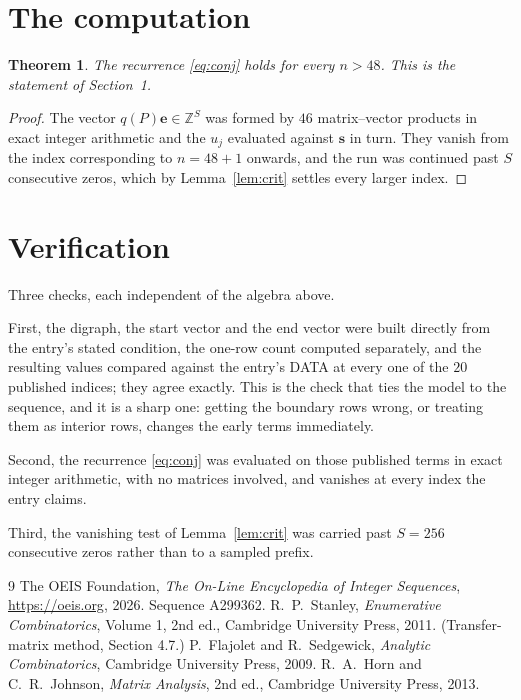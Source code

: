 \documentclass[11pt,a4paper]{article}
\theoremstyle{plain}
\newtheorem{theorem}{Theorem}
\theoremstyle{definition}
\begin{document}
\section{The computation}

\begin{theorem}
The recurrence \eqref{eq:conj} holds for every $n>48$. This is the statement of
Section~1.
\end{theorem}

\begin{proof}
The vector $q(P)\mathbf{e}\in\mathbb{Z}^{S}$ was formed by $46$ matrix--vector
products in exact integer arithmetic and the $u_j$ evaluated against $\mathbf{s}$ in turn.
They vanish from the index corresponding to $n=48+1$ onwards, and the run was continued
past $S$ consecutive zeros, which by Lemma~\ref{lem:crit} settles every larger index.
\end{proof}

\section{Verification}

Three checks, each independent of the algebra above.

First, the digraph, the start vector and the end vector were built directly from the
entry's stated condition, the one-row count computed separately, and the resulting values
compared against the entry's DATA at every one of the $20$ published indices; they
agree exactly. This is the check that ties the model to the sequence, and it is a sharp one:
getting the boundary rows wrong, or treating them as interior rows, changes the early terms
immediately.

Second, the recurrence \eqref{eq:conj} was evaluated on those published terms in exact
integer arithmetic, with no matrices involved, and vanishes at every index the entry claims.

Third, the vanishing test of Lemma~\ref{lem:crit} was carried past $S=256$ consecutive
zeros rather than to a sampled prefix.

\begin{thebibliography}{9}
 The OEIS Foundation, \emph{The On-Line Encyclopedia of Integer
Sequences}, \url{https://oeis.org}, 2026. Sequence A299362.
 R.~P.~Stanley, \emph{Enumerative Combinatorics}, Volume 1, 2nd ed.,
Cambridge University Press, 2011. (Transfer-matrix method, Section 4.7.)
 P.~Flajolet and R.~Sedgewick, \emph{Analytic Combinatorics}, Cambridge
University Press, 2009.
 R.~A.~Horn and C.~R.~Johnson, \emph{Matrix Analysis}, 2nd ed., Cambridge
University Press, 2013.
\end{thebibliography}
\end{document}
